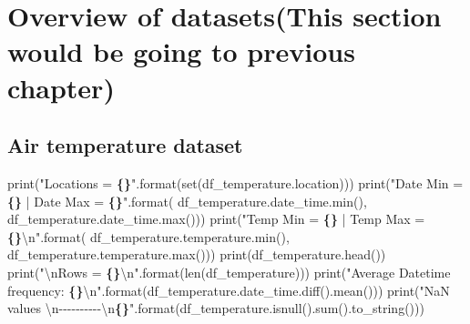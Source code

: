 \documentclass[mstat,12pt,a4paper]{unswthesis}
\newenvironment{Shaded}{\begin{snugshade}}{\end{snugshade}}
\newcommand{\BuiltInTok}[1]{#1}
\newcommand{\CharTok}[1]{\textcolor[rgb]{0.31,0.60,0.02}{#1}}
\newcommand{\NormalTok}[1]{#1}
\newcommand{\SpecialCharTok}[1]{\textcolor[rgb]{0.81,0.36,0.00}{\textbf{#1}}}
\newcommand{\StringTok}[1]{\textcolor[rgb]{0.31,0.60,0.02}{#1}}
\begin{document}
\section{\texorpdfstring{Overview of datasets\textbf{(This section would
be going to previous
chapter)}}{Overview of datasets(This section would be going to previous chapter)}}\label{overview-of-datasetsthis-section-would-be-going-to-previous-chapter}

\subsection{Air temperature dataset}\label{air-temperature-dataset}

\begin{Shaded}
\begin{Highlighting}[]
\BuiltInTok{print}\NormalTok{(}\StringTok{"Locations = }\SpecialCharTok{\{\}}\StringTok{"}\NormalTok{.}\BuiltInTok{format}\NormalTok{(}\BuiltInTok{set}\NormalTok{(df\_temperature.location)))}
\BuiltInTok{print}\NormalTok{(}\StringTok{"Date Min = }\SpecialCharTok{\{\}}\StringTok{  |  Date Max = }\SpecialCharTok{\{\}}\StringTok{"}\NormalTok{.}\BuiltInTok{format}\NormalTok{(}
\NormalTok{    df\_temperature.date\_time.}\BuiltInTok{min}\NormalTok{(), df\_temperature.date\_time.}\BuiltInTok{max}\NormalTok{()))}
\BuiltInTok{print}\NormalTok{(}\StringTok{"Temp Min = }\SpecialCharTok{\{\}}\StringTok{  |  Temp Max = }\SpecialCharTok{\{\}}\CharTok{\textbackslash{}n}\StringTok{"}\NormalTok{.}\BuiltInTok{format}\NormalTok{(}
\NormalTok{    df\_temperature.temperature.}\BuiltInTok{min}\NormalTok{(), df\_temperature.temperature.}\BuiltInTok{max}\NormalTok{()))}
\BuiltInTok{print}\NormalTok{(df\_temperature.head())}
\BuiltInTok{print}\NormalTok{(}\StringTok{"}\CharTok{\textbackslash{}n}\StringTok{Rows = }\SpecialCharTok{\{\}}\CharTok{\textbackslash{}n}\StringTok{"}\NormalTok{.}\BuiltInTok{format}\NormalTok{(}\BuiltInTok{len}\NormalTok{(df\_temperature)))}
\BuiltInTok{print}\NormalTok{(}\StringTok{"Average Datetime frequency: }\SpecialCharTok{\{\}}\CharTok{\textbackslash{}n}\StringTok{"}\NormalTok{.}\BuiltInTok{format}\NormalTok{(df\_temperature.date\_time.diff().mean()))}
\BuiltInTok{print}\NormalTok{(}\StringTok{"NaN values }\CharTok{\textbackslash{}n}\StringTok{{-}{-}{-}{-}{-}{-}{-}{-}{-}{-}}\CharTok{\textbackslash{}n}\SpecialCharTok{\{\}}\StringTok{"}\NormalTok{.}\BuiltInTok{format}\NormalTok{(df\_temperature.isnull().}\BuiltInTok{sum}\NormalTok{().to\_string()))}
\end{Highlighting}
\end{Shaded}
\end{document}
